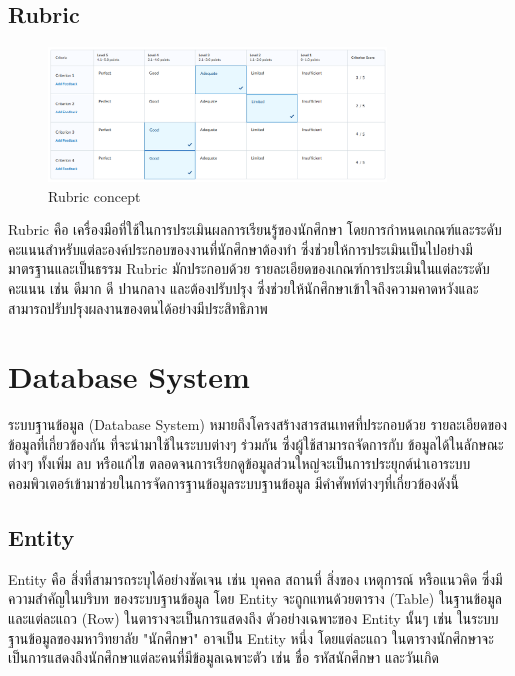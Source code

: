   \subsection{Rubric}
    \begin{figure}[!h]
      \centering
      \includegraphics[width=0.8\textwidth]{image/Background/Rubrics.png}
      \caption[Rubric]{Rubric concept}
      \label{fig:rubric_pic}
    \end{figure}
    \FloatBarrier
    \qquad Rubric คือ เครื่องมือที่ใช้ในการประเมินผลการเรียนรู้ของนักศึกษา
    โดยการกำหนดเกณฑ์และระดับคะแนนสำหรับแต่ละองค์ประกอบของงานที่นักศึกษาต้องทำ
    ซึ่งช่วยให้การประเมินเป็นไปอย่างมีมาตรฐานและเป็นธรรม Rubric มักประกอบด้วย
    รายละเอียดของเกณฑ์การประเมินในแต่ละระดับคะแนน เช่น ดีมาก ดี ปานกลาง และต้องปรับปรุง
    ซึ่งช่วยให้นักศึกษาเข้าใจถึงความคาดหวังและสามารถปรับปรุงผลงานของตนได้อย่างมีประสิทธิภาพ \cite{Rubric}

\section{Database System}
  \qquad ระบบฐานข้อมูล (Database System) หมายถึงโครงสร้างสารสนเทศที่ประกอบด้วย รายละเอียดของข้อมูลที่เกี่ยวข้องกัน
  ที่จะนำมาใช้ในระบบต่างๆ ร่วมกัน ซึ่งผู้ใช้สามารถจัดการกับ ข้อมูลได้ในลักษณะต่างๆ ทั้งเพิ่ม ลบ หรือแก้ไข
  ตลอดจนการเรียกดูข้อมูลส่วนใหญ่จะเป็นการประยุกต์นำเอาระบบคอมพิวเตอร์เข้ามาช่วยในการจัดการฐานข้อมูลระบบฐานข้อมูล
  มีคําศัพท์ต่างๆที่เกี่ยวข้องดังนี้ \cite{DataBaseSystem}
  \subsection{Entity}
    \qquad Entity คือ สิ่งที่สามารถระบุได้อย่างชัดเจน เช่น บุคคล สถานที่ สิ่งของ เหตุการณ์ หรือแนวคิด ซึ่งมีความสำคัญในบริบท
    ของระบบฐานข้อมูล โดย Entity จะถูกแทนด้วยตาราง (Table) ในฐานข้อมูล และแต่ละแถว (Row) ในตารางจะเป็นการแสดงถึง
    ตัวอย่างเฉพาะของ Entity นั้นๆ เช่น ในระบบฐานข้อมูลของมหาวิทยาลัย "นักศึกษา" อาจเป็น Entity หนึ่ง โดยแต่ละแถว
    ในตารางนักศึกษาจะเป็นการแสดงถึงนักศึกษาแต่ละคนที่มีข้อมูลเฉพาะตัว เช่น ชื่อ รหัสนักศึกษา และวันเกิด \cite{Entity}

